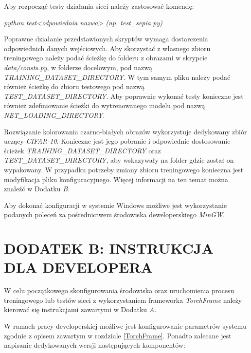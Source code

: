   \noindent
  Aby rozpocząć testy działania sieci należy zastosować komendę:

  \textit{python test<odpowiednia nazwa> (np. test\_sepia.py)}

  Poprawne działanie przedstawionych skryptów wymaga dostarczenia odpowiednich
  danych wejściowych. Aby skorzystać z własnego zbioru treningowego należy podać
  ścieżkę do folderu z obrazami w skrypcie \textit{data/consts.py}, w folderze docelowym,
  pod nazwą \textit{TRAINING\_DATASET\_DIRECTORY}. W tym samym pliku należy podać
  również ścieżkę do zbioru testowego pod nazwą \textit{TEST\_DATASET\_DIRECTORY}.
  Aby poprawnie wykonać testy konieczne jest również zdefiniowanie ścieżki do
  wytrenowanego modelu pod nazwą \textit{NET\_LOADING\_DIRECTORY}.

  Rozwiązanie kolorowania czarno-białych obrazów wykorzystuje dedykowany
  zbiór uczący \textit{CIFAR-10}. Konieczne jest jego pobranie i
  odpowiednie dostosowanie ścieżek \textit{TRAINING\_DATASET\_DIRECTORY}
  oraz \textit{TEST\_DATASET\_DIRECTORY}, aby wskazywały na folder gdzie został
  on wypakowany. W przypadku potrzeby zmiany zbioru treningowego konieczna jest
  modyfikacja pliku konfiguracyjnego. Więcej informacji na ten temat można znaleźć
  w Dodatku \textit{B}.

  Aby dokonać konfiguracji w systemie Windows możliwe jest wykorzystanie
  podanych poleceń za pośrednictwem środowiska deweloperskiego \textit{MinGW}.

\newpage
\section*{DODATEK B: INSTRUKCJA DLA DEVELOPERA}

  W celu początkowego skonfigurowania środowiska oraz uruchomienia procesu
  treningowego lub testów sieci z wykorzystaniem frameworka \textit{TorchFrame}
  należy kierować się instrukcjami zawartymi w Dodatku \textit{A}.

  W ramach pracy developerskiej możliwe jest konfigurowanie parametrów systemu
  zgodnie z opisem zawartym w rozdziale \ref{TorchFrame}. Ponadto zalecane jest
  napisanie dedykowanych wersji następujących komponentów:

